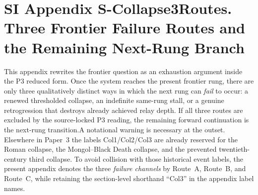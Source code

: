 \documentclass[11pt]{article}
\begin{document}
\section*{SI Appendix S-Collapse3Routes. Three Frontier Failure Routes and the Remaining Next-Rung Branch}
\label{sec:S-Collapse3Routes}This appendix rewrites the frontier question as an exhaustion argument inside the P3 reduced form. Once the system reaches the present frontier rung, there are only three qualitatively distinct ways in which the next rung can \emph{fail} to occur: a renewed thresholded collapse, an indefinite same-rung stall, or a genuine retrogression that destroys already achieved relay depth. If all three routes are excluded by the source-locked P3 reading, the remaining forward continuation is the next-rung transition.A notational warning is necessary at the outset. Elsewhere in Paper~3 the labels Col1/Col2/Col3 are already reserved for the Roman collapse, the Mongol--Black Death collapse, and the prevented twentieth-century third collapse. To avoid collision with those historical event labels, the present appendix denotes the three \emph{failure channels} by Route~A, Route~B, and Route~C, while retaining the section-level shorthand ``Col3'' in the appendix label names.
\end{document}

